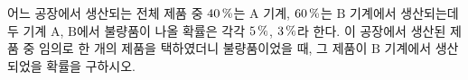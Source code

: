 어느 공장에서 생산되는 전체 제품 중 $40\mkern3mu \%$는 $\mathrm{A}$ 기계, $60\mkern3mu \%$는 $\mathrm{B}$ 기계에서 생산되는데 두 기계 $\mathrm{A}$, $\mathrm{B}$에서 불량품이 나올 확률은 각각 $5\mkern3mu \%$, $3\mkern3mu \%$라 한다. 이 공장에서 생산된 제품 중 임의로 한 개의 제품을 택하였더니 불량품이었을 때, 그 제품이 $\mathrm{B}$ 기계에서 생산되었을 확률을 구하시오.
